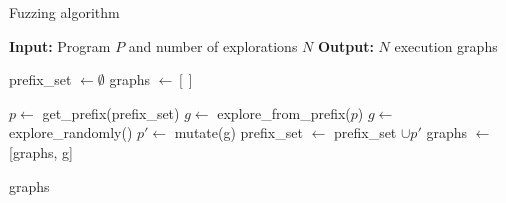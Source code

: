 \begin{algorithm}
    \caption{Fuzzing algorithm}
    \begin{algorithmic}
    \STATE \textbf{Input:} Program $P$ and number of explorations $N$
    \STATE \textbf{Output:} $N$ execution graphs
    
    \STATE prefix\_set $\leftarrow \emptyset$
    \STATE graphs $\leftarrow [ ]$
    
            \STATE $p \leftarrow$ get\_prefix(prefix\_set)
            \STATE $g \leftarrow $ explore\_from\_prefix($p$)
        \ELSE 
            \STATE $g \leftarrow $ explore\_randomly()
        \ENDIF 
            \STATE $p' \leftarrow$ mutate(g)
            \STATE prefix\_set $\leftarrow$ prefix\_set $\cup p'$        
        \ENDIF
        \STATE graphs $\leftarrow$ [graphs, g]
    \ENDFOR
    
    \RETURN graphs
    \end{algorithmic}
\end{algorithm}









